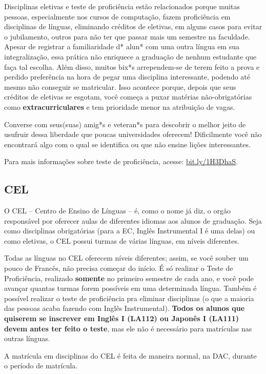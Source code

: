 Disciplinas eletivas e teste de proficiência estão relacionados porque muitas
pessoas, especialmente nos cursos de computação, fazem proficiência em
disciplinas de línguas, eliminando créditos de eletivas, em alguns casos para
evitar o jubilamento, outros para não ter que passar mais um semestre na
faculdade. Apesar de registrar a familiaridade d* alun* com uma outra língua em
sua integralização, essa prática não enriquece a graduação de nenhum estudante
que faça tal escolha. Além disso, muitos bix*s arrependem-se de terem feito a
prova e perdido preferência na hora de pegar uma disciplina interessante,
podendo até mesmo não conseguir se matricular. Isso acontece porque, depois que
seus créditos de eletivas se esgotam, você começa a puxar matérias
não-obrigatórias como \textbf{extracurriculares} e tem prioridade menor na
atribuição de vagas.

Converse com seus(suas) amig*s e veteran*s para descobrir o melhor jeito de
usufruir dessa liberdade que poucas universidades oferecem! Dificilmente você
não encontrará algo com o qual se identifica ou que não ensine lições
interessantes.

Para mais informações sobre teste de proficiência, acesse: \url{bit.ly/1H3DhaS}.

\subsection{CEL}

O CEL – Centro de Ensino de Línguas – é, como o nome já diz, o orgão responsável
por oferecer aulas de diferentes idiomas aos alunos de graduação. Seja como
disciplinas obrigatórias (para a EC, Inglês Instrumental I é uma delas) ou como
eletivas, o CEL possui turmas de várias línguas, em níveis diferentes.

Todas as línguas no CEL oferecem níveis diferentes; assim, se você souber um pouco
de Francês, não precisa começar do início. É só realizar o Teste de Proficiência,
realizado \textbf{somente} no primeiro semestre de cada ano, e você pode avançar
quantas turmas forem possíveis em uma determinada língua. Também é possível
realizar o teste de proficiência pra eliminar disciplinas (o que a maioria das
pessoas acaba fazendo com Inglês Instrumental). \textbf{Todos os alunos que
quiserem se inscrever em Inglês I (LA112) ou Japonês I (LA111) devem antes ter
feito o teste}, mas ele não é necessário para matrículas nas outras línguas.

A matrícula em disciplinas do CEL é feita de maneira normal, na DAC, durante o
período de matrícula.

